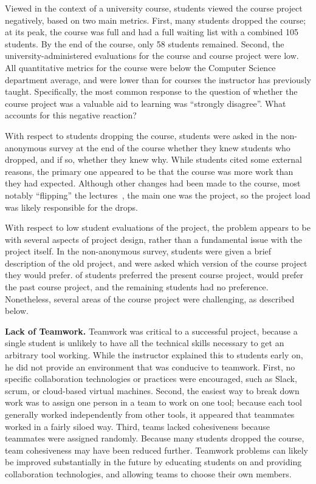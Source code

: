 \documentclass[10pt,conference]{IEEEtran}
\begin{document}
Viewed in the context of a university course,
students viewed the course project negatively,
based on two main metrics.
First, many students dropped the course; 
at its peak, the course was full and had a full
waiting list with a combined 105 students.
By the end of the course, only 58 students remained.
Second, the university-administered evaluations for
the course and course project were low.
All quantitative metrics for the course were below
the Computer Science department average, and were
lower than for courses the instructor has previously
taught.
Specifically, the most common response to the question
of whether the course project was a valuable aid to learning
was ``strongly disagree''.
What accounts for this negative reaction?

With respect to students dropping the course, students were asked
in the non-anonymous survey at the end of the course whether they knew
students who dropped, and if so, whether they knew why.
While students cited some external reasons, the 
primary one appeared to be that the course was more work
than they had expected.
Although other changes had been made to the course, 
most notably ``flipping'' the lectures~\cite{flipped},
the main one was the project, so the project load
was likely responsible for the drops.

With respect to low student evaluations of the project,
the problem appears to be with several aspects of project
design, rather than a fundamental issue with the project itself.
In the non-anonymous survey, students were given a brief description
of the old project, and were asked which version of the course project
they would prefer.
\projectLikeThis of students preferred the present course project,
\projectLikeOther would prefer the past course project,
and the remaining students had no preference.
Nonetheless, several areas of the course project were challenging,
as described below.

\textbf{Lack of Teamwork.}
  	Teamwork was critical to a successful project, because a single student
  	is unlikely to have all the technical skills necessary to get an
  	arbitrary tool working.
  	While the instructor explained this to students early on, 
  	he did not provide an environment that was conducive to teamwork.
  	First, no specific collaboration technologies or practices were encouraged,
  	such as Slack, scrum, or cloud-based virtual machines.
  	Second, the easiest way to break down work was to assign one person in a team
  	to work on one tool; because each tool generally worked independently
  	from other tools, it appeared that teammates worked in a fairly siloed way.  	
  	Third, teams lacked cohesiveness because teammates were assigned randomly.
  	Because many students dropped the course, team cohesiveness may have 
	been reduced further.
	Teamwork problems can likely be improved substantially in the future by 
	educating students on and providing collaboration technologies, and allowing
	teams to choose their own members. 
\end{document}
